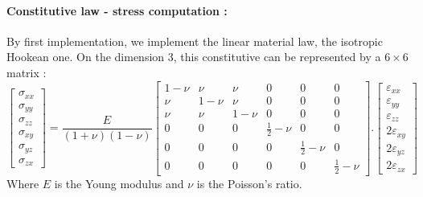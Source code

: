 \documentclass[a4paper,10pt]{article}
\begin{document}
\paragraph{Constitutive law - stress computation :} By first implementation, we implement the linear material law, the isotropic Hookean one. On the dimension 3, this constitutive can be represented by a $6\times6$ matrix :  
\[
\left[ 
\begin{array}{c}
\sigma_{xx}      \\
\sigma_{yy}      \\
\sigma_{zz}      \\
\sigma_{xy}      \\
\sigma_{yz}      \\
\sigma_{zx}   
\end{array}
\right]
           =\frac{E}{(1+\nu)(1-\nu)}
\left[ 
\begin{array}{cccccc}
1-\nu  &\nu   &\nu    & 0 & 0 & 0   \\
 \nu   &1-\nu &\nu    & 0 & 0 & 0   \\
 \nu   & \nu  & 1-\nu & 0 & 0 & 0   \\
 0 & 0 & 0 &               \frac{1}{2}-\nu   &         0      & 0  \\
 0 & 0 & 0 &                       0         &\frac{1}{2}-\nu &  0 \\
 0 & 0 & 0 &                       0         & 0              &\frac{1}{2}-\nu    
\end{array}
\right]
.
\left[ 
\begin{array}{c}
\varepsilon_{xx}      \\
\varepsilon_{yy}      \\
\varepsilon_{zz}      \\
2\varepsilon_{xy}     \\
2\varepsilon_{yz}      \\
2\varepsilon_{zx}   
\end{array}
\right]
\]
Where $E$ is the Young modulus and $\nu$ is the Poisson's ratio.
\end{document}

